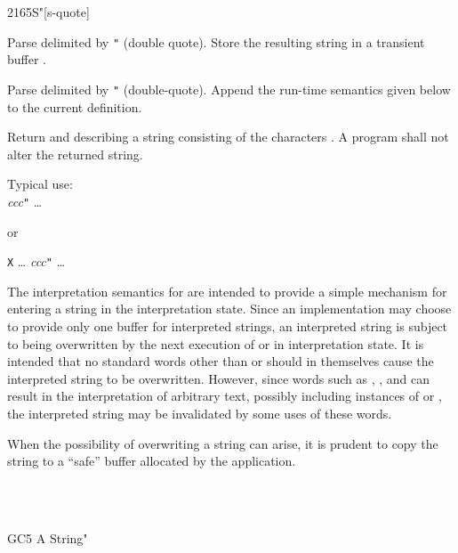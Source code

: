 \begin{worddef}[Sq]{2165}{S"}[s-quote]
\interpret

	Parse  delimited by \texttt{"} (double quote).
	Store the resulting string in a transient buffer .

\compile

	Parse  delimited by \texttt{"} (double-quote).
	Append the run-time semantics given below to the current
	definition.

\runtime

	Return  and  describing a string
	consisting of the characters . A program shall
	not alter the returned string.


	\begin{rationale} %
		Typical use: \\
			\tab {\ldots}  \emph{ccc}\texttt{"} {\ldots} \par
			or \par
			\tab \word{:} \texttt{X} {\ldots}
				 \emph{ccc}\texttt{"}
			{\ldots} \word{;}

		The interpretation semantics for  are intended to
		provide a simple mechanism for entering a string in the
		interpretation state. Since an implementation may choose to
		provide only one buffer for interpreted strings, an
		interpreted string is subject to being overwritten by the
		next execution of  or  in interpretation
		state. It is intended that no standard words other than
		 or  should in themselves cause the
		interpreted string to be overwritten.
		However, since words such as ,
		,  and
		 can result in the interpretation of arbitrary
		text, possibly including instances of  or ,
		the interpreted string may be invalidated by some uses of these
		words.

		When the possibility of overwriting a string can arise, it is
		prudent to copy the string to a ``safe'' buffer allocated by
		the application.
	\end{rationale}

	\begin{testing} %
		 \\
		 \\

		\word{:} GC5  A String" \word{;}   \\

		 \quad {} 
	\end{testing}
\end{worddef}



